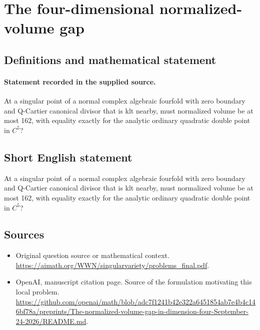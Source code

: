 \documentclass[11pt]{article}
\begin{document}
\section*{The four-dimensional normalized-volume gap}\label{statement}
\subsection{Definitions and mathematical statement}
\paragraph{Statement recorded in the supplied source.}
At a singular point of a normal complex algebraic fourfold with zero boundary and Q-Cartier canonical divisor that is klt nearby, must normalized volume be at most 162, with equality exactly for the analytic ordinary quadratic double point in $C^{5}$?
\subsection{Short English statement}
At a singular point of a normal complex algebraic fourfold with zero boundary and Q-Cartier canonical divisor that is klt nearby, must normalized volume be at most 162, with equality exactly for the analytic ordinary quadratic double point in $C^{5}$?
\subsection{Sources}
\begin{itemize}
\item[S1] Original question source or mathematical context.
\url{https://aimath.org/WWN/singularvariety/problems_final.pdf}.
\item[S2] OpenAI, manuscript citation page. Source of the formulation motivating this local problem.
\url{https://github.com/openai/math/blob/adc7f1241b42e322a6451854ab7e4b4c146bf78a/preprints/The-normalized-volume-gap-in-dimension-four-September-24-2026/README.md}.
\end{itemize}
\end{document}

